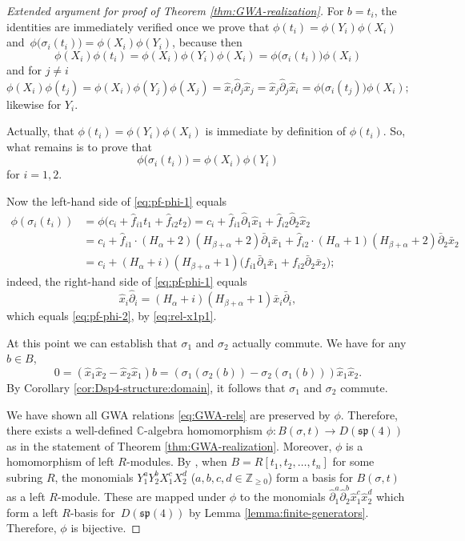 \documentclass[pdftex]{sigma}
\numberwithin{equation}{section}
\begin{document}
\begin{proof}[Extended argument for proof of Theorem \ref{thm:GWA-realization}]
	For $b=t_i$, the identities are immediately verified once we prove that $\phi(t_i)=\phi(Y_i)\phi(X_i)$ and~${\phi\big(\sigma_i(t_i)\big)=\phi(X_i)\phi(Y_i)}$, because then
	\[\phi(X_i)\phi(t_i)=\phi(X_i)\phi(Y_i)\phi(X_i)=\phi\big(\sigma_i(t_i)\big)\phi(X_i)\]
	and for $j\neq i$
	\[ \phi(X_i)\phi(t_j)=\phi(X_i)\phi(Y_j)\phi(X_j)=\hat{x}_i\hat{\partial}_j\hat{x}_j=\hat{x}_j\hat{\partial}_j\hat{x}_i=\phi\big(\sigma_i(t_j)\big)\phi(X_i);\]
	likewise for $Y_i$.
	
	Actually, that $\phi(t_i)=\phi(Y_i)\phi(X_i)$ is immediate by definition of $\phi(t_i)$. So, what remains is to prove that
	\begin{equation}\label{eq:pf-phi-1}
		\phi\big(\sigma_i(t_i))=\phi(X_i)\phi(Y_i)
	\end{equation}
	for $i=1,2$.
	
	Now the left-hand side of \eqref{eq:pf-phi-1} equals
	\begin{align}
		\phi(\sigma_i(t_i))&=\phi\bigl(c_i+\hat f_{i1}t_1+\hat f_{i2}t_2\bigr)=c_i+\hat f_{i1}\hat{\partial}_1\hat{x}_1+\hat f_{i2}\hat{\partial}_2\hat{x}_2 \nonumber\\
		&=c_i+\hat f_{i1}\cdot(H_\alpha+2)(H_{\beta+\alpha}+2)\bar{\partial}_1\bar{x}_1+\hat f_{i2}\cdot (H_\alpha+1)(H_{\beta+\alpha}+2)\bar{\partial}_2\bar{x}_2\nonumber\\
		&=c_i+(H_\alpha+i)(H_{\beta+\alpha}+1)\bigl(f_{i1}\bar{\partial}_1\bar{x}_1+f_{i2}\bar{\partial}_2\bar{x}_2\bigr);\label{eq:pf-phi-2}
	\end{align}
	indeed, the right-hand side of \eqref{eq:pf-phi-1} equals
	\[\hat{x}_i\hat{\partial}_i=(H_\alpha+i)(H_{\beta+\alpha}+1)\bar{x}_i\bar{\partial}_i,\]
	which equals \eqref{eq:pf-phi-2}, by \eqref{eq:rel-x1p1}.
	
	At this point we can establish that $\sigma_1$ and $\sigma_2$ actually commute.
	We have for any $b\in B$,
	\[0=(\hat{x}_1\hat{x}_2 -\hat{x}_2\hat{x}_1)b = (\sigma_1(\sigma_2(b))-\sigma_2(\sigma_1(b)))\hat{x}_1\hat{x}_2.\]
	By Corollary \ref{cor:Dsp4-structure:domain}, it follows that $\sigma_1$ and $\sigma_2$ commute.
	
	We have shown all GWA relations \eqref{eq:GWA-rels} are preserved by $\phi$. Therefore, there exists a well-defined $\mathbb{C}$-algebra homomorphism $\phi\colon B(\sigma,t)\to D(\mathfrak{sp}(4))$ as in the statement of Theorem \ref{thm:GWA-realization}. Moreover, $\phi$ is a homomorphism of left $R$-modules.
	By \cite{bavula1992generalized}, when $B=R[t_1,t_2,\dots,t_n]$ for some subring $R$, the monomials $Y_1^aY_2^bX_1^cX_2^d$ ($a,b,c,d\in\mathbb{Z}_{\geq 0}$) form a basis for $B(\sigma,t)$ as a left $R$-module. These are mapped under $\phi$ to the monomials $\hat{\partial}_1^a\hat{\partial}_2^b\hat{x}_1^c\hat{x}_2^d$ which form a left $R$-basis for~$D(\mathfrak{sp}(4))$ by Lemma \ref{lemma:finite-generators}.
	Therefore, $\phi$ is bijective.
\end{proof}
\end{document}

